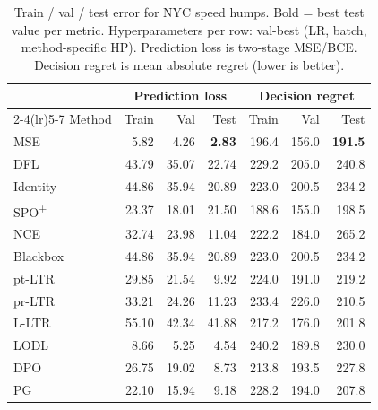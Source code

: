 \begin{table}[h]
\centering
\caption[Train/val/test error for NYC speed humps.]{Train / val / test error for NYC speed humps. Bold = best test value per metric. Hyperparameters per row: val-best (LR, batch, method-specific HP). Prediction loss is two-stage MSE/BCE. Decision regret is mean absolute regret (lower is better).}
\label{tab:err-speed-humps}
\setlength{\tabcolsep}{4pt}
\renewcommand{\arraystretch}{1.05}
\begin{tabular}{@{}lrrrrrr@{}}
\toprule
& \multicolumn{3}{c}{Prediction loss} & \multicolumn{3}{c}{Decision regret} \\
\cmidrule(lr){2-4}\cmidrule(lr){5-7}
Method & Train & Val & Test & Train & Val & Test \\
\midrule
MSE & 5.82 & 4.26 & \textbf{2.83} & 196.4 & 156.0 & \textbf{191.5} \\
DFL & 43.79 & 35.07 & 22.74 & 229.2 & 205.0 & 240.8 \\
Identity & 44.86 & 35.94 & 20.89 & 223.0 & 200.5 & 234.2 \\
SPO\textsuperscript{+} & 23.37 & 18.01 & 21.50 & 188.6 & 155.0 & 198.5 \\
NCE & 32.74 & 23.98 & 11.04 & 222.2 & 184.0 & 265.2 \\
Blackbox & 44.86 & 35.94 & 20.89 & 223.0 & 200.5 & 234.2 \\
pt-LTR & 29.85 & 21.54 & 9.92 & 224.0 & 191.0 & 219.2 \\
pr-LTR & 33.21 & 24.26 & 11.23 & 233.4 & 226.0 & 210.5 \\
L-LTR & 55.10 & 42.34 & 41.88 & 217.2 & 176.0 & 201.8 \\
LODL & 8.66 & 5.25 & 4.54 & 240.2 & 189.8 & 230.0 \\
DPO & 26.75 & 19.02 & 8.73 & 213.8 & 193.5 & 227.8 \\
PG & 22.10 & 15.94 & 9.18 & 228.2 & 194.0 & 207.8 \\
\bottomrule
\end{tabular}
\end{table}

